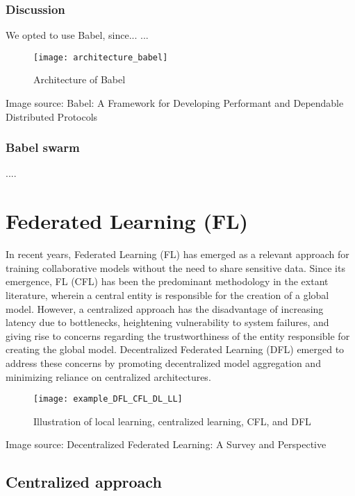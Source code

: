 \subsubsection{Discussion}
\label{sec:discussion_decentralized_frameworks}

We opted to use Babel, since...
...

\begin{figure}[H]
  \centering
  \texttt{[image: architecture\_babel]}
  \caption{Architecture of Babel}
  \label{fig:architecture_babel}
\end{figure}

Image source: Babel: A Framework for Developing Performant and Dependable Distributed Protocols

\subsubsection{Babel swarm}
\label{sec:babel_swarm}

....


\section{Federated Learning (FL)}
\label{sec:federated_learning}

In recent years, Federated Learning (FL) has emerged as a relevant approach for training collaborative models without the need to share sensitive data. Since its emergence, \gls{FL} (\gls{CFL}) has been the predominant methodology in the extant literature, wherein a central entity is responsible for the creation of a global model. However, a centralized approach has the disadvantage of increasing latency due to bottlenecks, heightening vulnerability to system failures, and giving rise to concerns regarding the trustworthiness of the entity responsible for creating the global model. Decentralized Federated Learning (DFL) emerged to address these concerns by promoting decentralized model aggregation and minimizing reliance on centralized architectures.

\begin{figure}[H]
  \centering
  \texttt{[image: example\_DFL\_CFL\_DL\_LL]}
  \caption{Illustration of local learning, centralized learning, CFL, and DFL}
  \label{fig:DFL_CFL_DL_LL}
\end{figure}

Image source: Decentralized Federated Learning: A Survey and Perspective

\subsection{Centralized approach}
\label{sub:centralized_approach}

